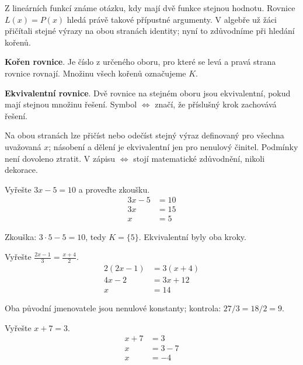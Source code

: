 \documentclass[11pt,a4paper]{article}
\begin{document}
Z lineárních funkcí známe otázku, kdy mají dvě funkce stejnou hodnotu. Rovnice $L(x)=P(x)$ hledá právě takové přípustné argumenty. V algebře už žáci přičítali stejné výrazy na obou stranách identity; nyní to zdůvodníme při hledání kořenů.
\begin{definiceBox}[title={Definice - Kořen rovnice}]
\textbf{Kořen rovnice}. Je číslo z určeného oboru, pro které se levá a pravá strana rovnice rovnají. Množinu všech kořenů označujeme $K$.
\end{definiceBox}
\begin{definiceBox}[title={Definice - Ekvivalentní rovnice}]
\textbf{Ekvivalentní rovnice}. Dvě rovnice na stejném oboru jsou ekvivalentní, pokud mají stejnou množinu řešení. Symbol $\Leftrightarrow$ značí, že příslušný krok zachovává řešení.
\end{definiceBox}
Na obou stranách lze přičíst nebo odečíst stejný výraz definovaný pro všechna uvažovaná $x$; násobení a dělení je ekvivalentní jen pro nenulový činitel. Podmínky není dovoleno ztratit. V zápisu $\Leftrightarrow$ stojí matematické zdůvodnění, nikoli dekorace.
\begin{prikladReseniBox}[title={Příklad 1}]
Vyřešte $3x-5=10$ a proveďte zkoušku.
\tcblower
\begin{align*}
3x-5 &= 10 \\
 3x &= 15 \\
 x &= 5
\end{align*}

Zkouška: $3\cdot5-5=10$, tedy $K=\{5\}$. Ekvivalentní byly oba kroky.
\end{prikladReseniBox}
\begin{prikladReseniBox}[title={Příklad 2}]
Vyřešte $\frac{2x-1}{3}=\frac{x+4}{2}$.
\tcblower
\begin{align*}
2(2x-1) &= 3(x+4) \\
 4x-2 &= 3x+12 \\
 x &= 14
\end{align*}

Oba původní jmenovatele jsou nenulové konstanty; kontrola: $27/3=18/2=9$.
\end{prikladReseniBox}
\begin{zadaniReseniBox}[title={Samostatná práce 1}]
Vyřešte $x+7=3$.
\tcblower
\begin{align*}
x+7 &= 3 \\
 x &= 3-7 \\
 x &= -4
\end{align*}
\end{zadaniReseniBox}
\end{document}
